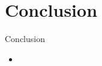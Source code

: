 \documentclass[xcolor=table]{beamer}
\begin{document}
%


\section{Conclusion}

\begin{frame}{Conclusion}
	\begin{itemize}
		\item 
	\end{itemize}
\end{frame}

%
%  
%  
\end{document}
